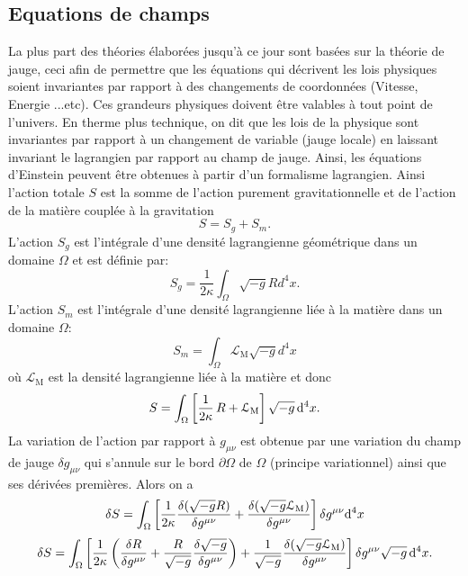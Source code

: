\documentclass[a4paper,12pt]{report}
\theoremstyle{plain}
\theoremstyle{plain}
\begin{document}
\subsection{Equations de champs}
La plus part des th\'eories \'elabor\'ees jusqu'\`a ce jour sont bas\'ees sur la th\'eorie de jauge, ceci afin de permettre que les \'equations qui d\'ecrivent les 
lois physiques soient invariantes par rapport \`a des changements de coordonn\'ees (Vitesse, Energie ...etc). Ces grandeurs physiques doivent
\^etre valables \`a tout point de l'univers. En therme plus technique, on dit que les lois de la physique sont invariantes par rapport
\`a un changement de variable (jauge locale) en laissant invariant le lagrangien par rapport au champ de jauge. Ainsi,
les \'equations d'Einstein peuvent \^etre obtenues \`a partir d'un formalisme lagrangien.   Ainsi l'action totale $S$ est la somme de 
l'action purement gravitationnelle et de l'action de la mati\`ere coupl\'ee \`a la gravitation \\
$$S = S_{g} + S_{m}.   $$ L'action $S_{g}$ est l'int\'egrale d'une densit\'e lagrangienne g\'eom\'etrique dans un domaine $\Omega$ et est  d\'efinie par:
 $$ S_{g} = \frac{1}{2 \kappa}\int_{\Omega} \sqrt{-g} R d^{4}x.   $$
L'action $S_{m}$ est l'int\'egrale d'une densit\'e lagrangienne li\'ee \`a la mati\`ere dans un domaine $\Omega$:
$$S_{m} = \int_{\Omega} \mathcal{L}_\mathrm{M} \sqrt{-g} d^{4}x $$                    
o\`u $ \mathcal{L}_\mathrm{M} $ est la densit\'e lagrangienne li\'ee \`a la mati\`ere et donc 
\begin{equation} 
   S = \int_{\Omega} \left[ {1 \over 2\kappa} \,  R + \mathcal{L}_\mathrm{M} \right] \sqrt{-g} \,  \mathrm{d}^4 x.   \label{aeq24}
\end{equation}
La variation de l'action par rapport \`a $g_{\mu\nu}$ est obtenue par une variation du champ de jauge 
$\delta g_{\mu\nu}$ qui s'annule sur le bord $\partial\Omega$ de $\Omega$ (principe variationnel)
ainsi que ses d\'eriv\'ees premi\`eres.   Alors on a
\begin{equation}
 \delta S  = \int_{\Omega} \left[ {1 \over 
2\kappa} \frac{\delta (\sqrt{-g}R)}{\delta g^{\mu\nu}} + \frac{\delta 
(\sqrt{-g} \mathcal{L}_\mathrm{M})}{\delta g^{\mu\nu}} \right] \delta 
g^{\mu\nu}\mathrm{d}^4x \label{aeq26}
\end{equation}
\begin{equation}\label{aeq27} 
 \delta S   = \int_{\Omega} \left[ {1 \over 2\kappa} \left( 
\frac{\delta R}{\delta g^{\mu\nu}} + \frac{R}{\sqrt{-g}} \frac{\delta 
\sqrt{-g}}{\delta g^{\mu\nu} } \right) + \frac{1}{\sqrt{-g}} 
\frac{\delta (\sqrt{-g} \mathcal{L}_\mathrm{M})}{\delta g^{\mu\nu}} 
\right] \delta g^{\mu\nu} \sqrt{-g}\,  \mathrm{d}^4x.    
\end{equation}
\end{document}
